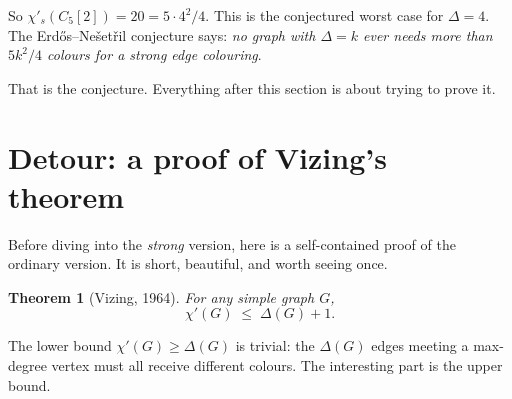 \documentclass[11pt]{article}
\newcommand{\sci}{\chi'_s}
\newtheorem*{theorem*}{Theorem}
\begin{document}
So $\sci(C_5[2]) = 20 = 5 \cdot 4^2 / 4$. This is the conjectured
worst case for $\Delta = 4$. The Erd\H{o}s--Ne\v{s}et\v{r}il
conjecture says: \emph{no graph with $\Delta = k$ ever needs more
than $5k^2/4$ colours for a strong edge colouring}.

That is the conjecture. Everything after this section is about
trying to prove it.

\section*{Detour: a proof of Vizing's theorem}

Before diving into the \emph{strong} version, here is a self-contained
proof of the ordinary version. It is short, beautiful, and worth
seeing once.

\begin{theorem*}[Vizing, 1964]
For any simple graph $G$,
\[
\chi'(G) \;\leq\; \Delta(G) + 1.
\]
\end{theorem*}

The lower bound $\chi'(G) \geq \Delta(G)$ is trivial: the $\Delta(G)$
edges meeting a max-degree vertex must all receive different colours.
The interesting part is the upper bound.
\end{document}
